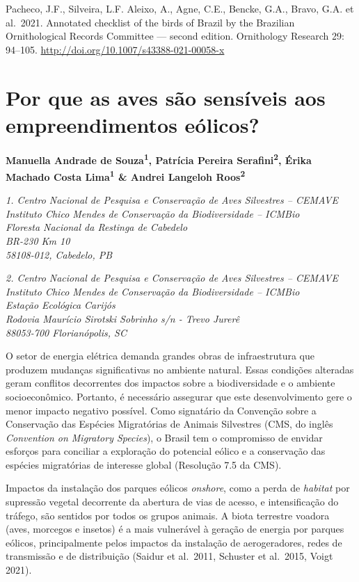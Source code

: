 \documentclass[
  oneside]{scrbook}
\begin{document}
Pacheco, J.F., Silveira, L.F. Aleixo, A., Agne, C.E., Bencke, G.A., Bravo, G.A. et al.~2021. Annotated checklist of the birds of Brazil by the Brazilian Ornithological Records Committee --- second edition. Ornithology Research 29: 94--105. \url{http://doi.org/10.1007/s43388-021-00058-x}

\hypertarget{cap4}{%
\chapter{Por que as aves são sensíveis aos empreendimentos eólicos?}\label{cap4}}

\pagestyle{headings}

\textbf{Manuella Andrade de Souza\textsuperscript{1}, Patrícia Pereira Serafini\textsuperscript{2}, Érika Machado Costa Lima\textsuperscript{1} \& Andrei Langeloh Roos\textsuperscript{2}}

\emph{1. Centro Nacional de Pesquisa e Conservação de Aves Silvestres -- CEMAVE}\\
\emph{Instituto Chico Mendes de Conservação da Biodiversidade -- ICMBio}\\
\emph{Floresta Nacional da Restinga de Cabedelo}\\
\emph{BR-230 Km 10}\\
\emph{58108-012, Cabedelo, PB}

\emph{2. Centro Nacional de Pesquisa e Conservação de Aves Silvestres -- CEMAVE}\\
\emph{Instituto Chico Mendes de Conservação da Biodiversidade -- ICMBio}\\
\emph{Estação Ecológica Carijós}\\
\emph{Rodovia Maurício Sirotski Sobrinho s/n - Trevo Jurerê}\\
\emph{88053-700 Florianópolis, SC}

O setor de energia elétrica demanda grandes obras de infraestrutura que produzem mudanças significativas no ambiente natural. Essas condições alteradas geram conflitos decorrentes dos impactos sobre a biodiversidade e o ambiente socioeconômico. Portanto, é necessário assegurar que este desenvolvimento gere o menor impacto negativo possível. Como signatário da Convenção sobre a Conservação das Espécies Migratórias de Animais Silvestres (CMS, do inglês \emph{Convention on Migratory Species}), o Brasil tem o compromisso de envidar esforços para conciliar a exploração do potencial eólico e a conservação das espécies migratórias de interesse global (Resolução 7.5 da CMS).

Impactos da instalação dos parques eólicos \emph{onshore}, como a perda de \emph{habitat} por supressão vegetal decorrente da abertura de vias de acesso, e intensificação do tráfego, são sentidos por todos os grupos animais. A biota terrestre voadora (aves, morcegos e insetos) é a mais vulnerável à geração de energia por parques eólicos, principalmente pelos impactos da instalação de aerogeradores, redes de transmissão e de distribuição (Saidur et al.~2011, Schuster et al.~2015, Voigt 2021).
\end{document}
